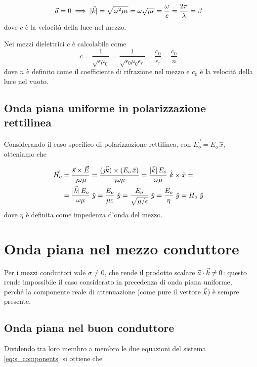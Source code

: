 		\begin{equation*}
				\vec{a} = 0 \implies |\vec{k}| = \sqrt{\omega^2 \mu \epsilon} = \omega \sqrt{\mu \epsilon} = \frac{\omega}{c} = \frac{2 \pi}{\lambda} = \beta
		\end{equation*}
		dove $c$ è la velocità della luce nel mezzo.

		Nei mezzi dielettrici $c$ è calcolabile come
		\begin{equation*}
				c = \frac{1}{\sqrt{\epsilon \mu_0}} = \frac{1}{\sqrt{\epsilon_0 \mu_0 \epsilon_r}} = \frac{c_0}{\epsilon_r} = \frac{c_0}{n}
		\end{equation*}
		dove $n$ è definito come il coefficiente di rifrazione nel mezzo e $c_0$ è la velocità della luce nel vuoto.

	\subsection{Onda piana uniforme in polarizzazione rettilinea}
		Considerando il caso specifico di polarizzazione rettilinea, con $\vec{E_o} = E_o \, \hat{x}$, otteniamo che

		\begin{equation*} \begin{split}
			\vec{H_o} &= \frac{\vec{s} \times \vec{E}} {\jmath \omega \mu}
				= \frac{(\jmath \vec{k}) \times (E_o \, \hat{x})}{\jmath \omega \mu}
				= \frac{|\vec{k}| \, E_o}{\omega \mu} ~ \hat{k} \times \hat{x} = \\
			& = \frac{|\vec{k}| \, E_o}{\omega \mu} ~ \hat{y}
				= \frac{E_o}{\mu c} ~ \hat{y}
				= \frac{E_o}{\sqrt{\mu / \epsilon}} ~ \hat{y}
				= \frac{E_o}{\eta} ~ \hat{y}
				= H_o ~ \hat{y}
		\end{split} \end{equation*}
		dove $\eta$ è definita come impedenza d'onda del mezzo.

\section{Onda piana nel mezzo conduttore}
	Per i mezzi conduttori vale $\sigma \neq 0$, che rende il prodotto scalare $\vec{a} \cdot \vec{k} \neq 0$: questo rende impossibile il caso considerato in precedenza di onda piana uniforme, perché la componente reale di attenuazione (come pure il vettore $\vec{k}$) è sempre presente.

	\subsection{Onda piana nel buon conduttore}
		Dividendo tra loro membro a membro le due equazioni del sistema \ref{eq:s_components} si ottiene che

